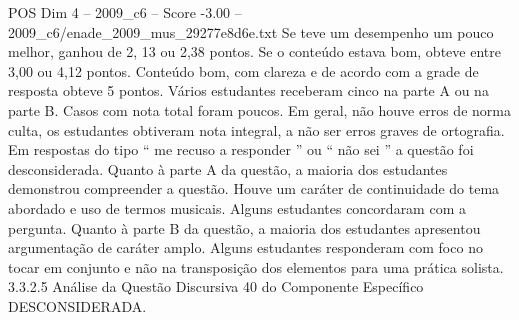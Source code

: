 \begin{textsample}{POS Dim 4 – 2009\_c6 – Score -3.00 – 2009\_c6/enade\_2009\_mus\_29277e8d6e.txt}
Se teve um desempenho um pouco melhor, ganhou de 2, 13 ou 2,38 pontos.
Se o conteúdo estava bom, obteve entre 3,00 ou 4,12 pontos.
Conteúdo bom, com clareza e de acordo com a grade de resposta obteve 5 pontos.
Vários estudantes receberam cinco na parte A ou na parte B.
Casos com nota total foram poucos.
Em geral, não houve erros de norma culta, os estudantes obtiveram nota integral, a não ser erros graves de ortografia.
Em respostas do tipo “ me recuso a responder ” ou “ não sei ” a questão foi desconsiderada.
Quanto à parte A da questão, a maioria dos estudantes demonstrou compreender a questão.
Houve um caráter de continuidade do tema abordado e uso de termos musicais.
Alguns estudantes concordaram com a pergunta.
Quanto à parte B da questão, a maioria dos estudantes apresentou argumentação de caráter amplo.
Alguns estudantes responderam com foco no tocar em conjunto e não na transposição dos elementos para uma prática solista. 3.3.2.5 Análise da Questão Discursiva 40 do Componente Específico DESCONSIDERADA.

\end{textsample}
